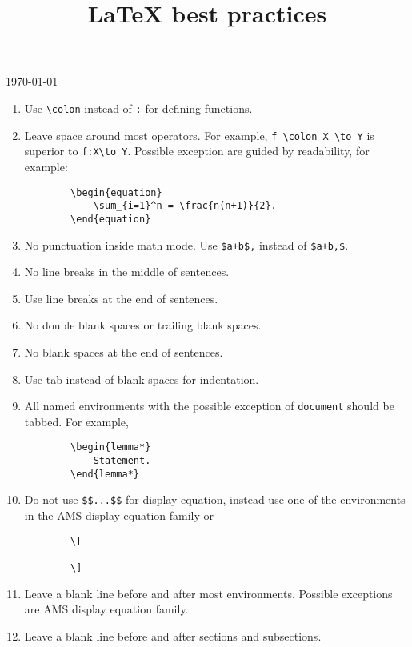 \documentclass{amsproc}
\title{{\LaTeX} best practices}
\begin{document}
	\noindent\today
	\maketitle

	\begin{enumerate}[1)]
		\item Use \verb|\colon| instead of \verb|:| for defining functions.

		\item Leave space around most operators.
		For example, \verb|f \colon X \to Y| is superior to \verb|f:X\to Y|.
		Possible exception are guided by readability, for example:
		\begin{verbatim}
		\begin{equation}
		    \sum_{i=1}^n = \frac{n(n+1)}{2}.
		\end{equation}
		\end{verbatim}

		\item No punctuation inside math mode.
		Use \verb|$a+b$,| instead of \verb|$a+b,$|.

		\item No line breaks in the middle of sentences.

		\item Use line breaks at the end of sentences.

		\item No double blank spaces or trailing blank spaces.

		\item No blank spaces at the end of sentences.

		\item Use tab instead of blank spaces for indentation.

		\item All named environments with the possible exception of \verb|document| should be tabbed.
		For example,
		\begin{verbatim}
		\begin{lemma*}
		    Statement.
		\end{lemma*}
		\end{verbatim}

		\item Do not use \verb|$$...$$| for display equation, instead use one of the environments in the AMS display equation family or
		\begin{verbatim}
		\[

		\]
		\end{verbatim}

		\item Leave a blank line before and after most environments.
		Possible exceptions are AMS display equation family.

		\item Leave a blank line before and after sections and subsections.
	\end{enumerate}
\end{document}
